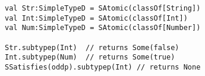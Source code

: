\begin{lstlisting}[style=scalaioScala]
val Str:SimpleTypeD = SAtomic(classOf[String])
val Int:SimpleTypeD = SAtomic(classOf[Int])
val Num:SimpleTypeD = SAtomic(classOf[Number])

Str.subtypep(Int)  // returns Some(false)
Int.subtypep(Num)  // returns Some(true)
SSatisfies(oddp).subtypep(Int) // returns None
\end{lstlisting}

